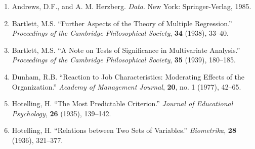 \par{}\vspace{4pt}

\begin{enumerate}[leftmargin=2.2em,itemsep=2pt]
\item Andrews, D.F., and A. M. Herzberg. \textit{Data}. New York: Springer-Verlag, 1985.
\item Bartlett, M.S. “Further Aspects of the Theory of Multiple Regression.” \textit{Proceedings of the Cambridge Philosophical Society}, \textbf{34} (1938), 33--40.
\item Bartlett, M.S. “A Note on Tests of Significance in Multivariate Analysis.” \textit{Proceedings of the Cambridge Philosophical Society}, \textbf{35} (1939), 180--185.
\item Dunham, R.B. “Reaction to Job Characteristics: Moderating Effects of the Organization.” \textit{Academy of Management Journal}, \textbf{20}, no. 1 (1977), 42--65.
\item Hotelling, H. “The Most Predictable Criterion.” \textit{Journal of Educational Psychology}, \textbf{26} (1935), 139--142.
\item Hotelling, H. “Relations between Two Sets of Variables.” \textit{Biometrika}, \textbf{28} (1936), 321--377.
\end{enumerate}
